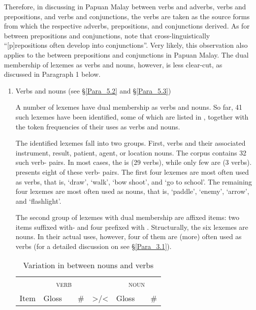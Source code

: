 Therefore, in discussing  in Papuan Malay  between verbs and adverbs, verbs and prepositions, and verbs and conjunctions, the verbs are taken as the source forms from which the respective adverbs, prepositions, and conjunctions derived. As for  between prepositions and conjunctions, \citet[4]{Heine.2002} note that cross-linguistically “[p]repositions often develop into conjunctions”. Very likely, this observation also applies to the  between prepositions and conjunctions in Papuan Malay. The dual membership of lexemes as verbs and nouns, however, is less clear-cut, as discussed in Paragraph 1 below.


\begin{enumerate}
\item 
Verbs and nouns (see §\ref{Para_5.2} and §\ref{Para_5.3})


A number of lexemes have dual membership as verbs and nouns. So far, 41 such lexemes have been identified, some of which are listed in , together with the token frequencies of their uses as verbs and nouns.



The identified lexemes fall into two groups. First, verbs and their associated instrument, result, patient, agent, or location nouns. The corpus contains 32 such verb- pairs. In most cases, the  is  (29 verbs), while only few are  (3 verbs).  presents eight of these verb- pairs. The first four lexemes are most often used as verbs, that is,  ‘draw’,  ‘walk’,  ‘bow shoot’, and  ‘go to school’. The remaining four lexemes are most often used as nouns, that is,  ‘paddle’,  ‘enemy’,  ‘arrow’, and  ‘flashlight’.



The second group of lexemes with dual membership are affixed items: two items suffixed with- and four prefixed with . Structurally, the six lexemes are nouns. In their actual uses, however, four of them are (more) often used as verbs (for a detailed discussion on  see §\ref{Para_3.1}).

\begin{table}[t]

\caption{Variation in  between nouns and verbs}\label{Table_5.43}
\setlength{\tabcolsep}{3.7pt}
\begin{tabularx}{\textwidth}{lllrcllr}
\lsptoprule
 & \multicolumn{3}{c}{\textsc{verb}} &  & \multicolumn{3}{c}{ \textsc{noun}}\\
 \multicolumn{1}{c}{Item} & \multicolumn{1}{c}{Gloss} &  & \# & {\textgreater}/{\textless} & \multicolumn{1}{c}{Gloss} &  &  \multicolumn{1}{r}{\#}\\
\midrule


\end{tabularx}
\end{table}
\end{enumerate}
